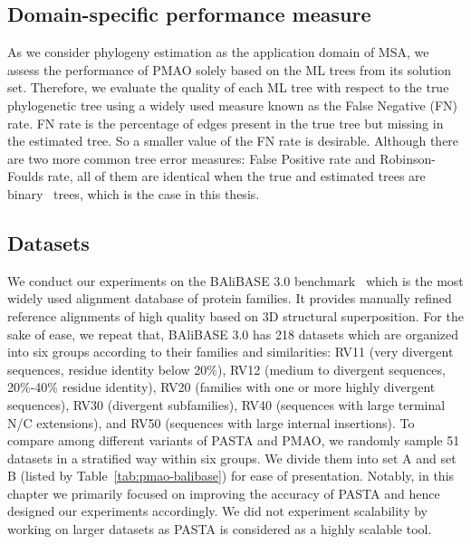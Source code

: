 \subsection{Domain-specific performance measure}
As we consider phylogeny estimation as the application domain of MSA, we assess the performance of PMAO solely based on the ML trees from its solution set. Therefore, we evaluate the quality of each ML tree with respect to the true phylogenetic tree
using a widely used measure known as the False Negative (FN) rate. FN rate is the percentage of edges present in the true tree but missing in the estimated tree. So a smaller value of the FN rate is desirable. Although there are two more common tree error measures: False Positive rate and Robinson-Foulds rate, all of them are identical when the true and estimated trees are binary~\cite{warnow2017computational} trees, which is the case in this thesis.


\subsection{Datasets}
We conduct our experiments on the BAliBASE 3.0 benchmark~\cite{thompson2005balibase} which is the most widely used alignment database of protein families. It provides manually refined reference alignments of high quality based on 3D structural superposition. For the sake of ease, we repeat that, BAliBASE 3.0 has 218 datasets which are organized into six groups according to their families and similarities: RV11 (very divergent sequences, residue identity below 20\%), RV12 (medium to divergent sequences, 20\%-40\% residue identity), RV20 (families with one or more highly divergent sequences), RV30 (divergent subfamilies), RV40 (sequences with large terminal N/C extensions), and RV50 (sequences with large internal insertions). To compare among different variants of PASTA and PMAO, we randomly sample 51 datasets in a stratified way within six groups. We divide them into set A and set B (listed by Table~\ref{tab:pmao-balibase}) for ease of presentation. Notably, in this chapter we primarily focused on improving the accuracy of PASTA and hence designed our experiments accordingly. We did not experiment scalability by working on larger datasets as PASTA is considered as a highly scalable tool.

